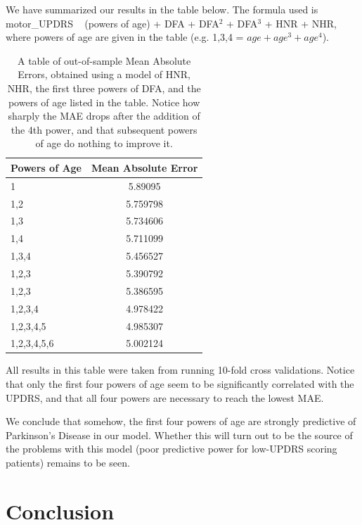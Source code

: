 \documentclass{report}
\begin{document}
We have summarized our results in the table below. The formula used is motor\_UPDRS ~ (powers of age) + DFA + DFA$^2$ + DFA$^3$ + HNR + NHR, where powers of age are given in
the table (e.g. 1,3,4 = $age + age^3 + age^4$).

\begin{table}

\centering
\begin{tabular}{l | c}
Powers of Age & Mean Absolute Error\\
\hline \hline
1 & 5.89095\\
\hline
1,2 & 5.759798\\
\hline
1,3 & 5.734606\\
\hline
1,4 & 5.711099\\
\hline
1,3,4 & 5.456527\\
\hline
1,2,3 & 5.390792\\
\hline
1,2,3 &  5.386595\\
\hline
1,2,3,4 & 4.978422\\
\hline
1,2,3,4,5 & 4.985307\\
\hline
1,2,3,4,5,6 & 5.002124\\
\hline
\end{tabular}

\caption{A table of out-of-sample Mean Absolute Errors, obtained using a model of HNR, NHR, the first three powers of DFA, and the powers of age listed in the table. Notice how sharply the MAE drops after the addition of the 4th power, and that subsequent powers of age do nothing to improve it.}

\end{table}

All results in this table were taken from running 10-fold cross validations. Notice that only the first four powers of age seem to be significantly correlated with
the UPDRS, and that all four powers are necessary to reach the lowest MAE.

We conclude that somehow, the first four powers of age are strongly predictive of Parkinson's Disease in our model. Whether this will turn out to be the source
of the problems with this model (poor predictive power for low-UPDRS scoring patients) remains to be seen.



\section*{Conclusion}
\end{document}
